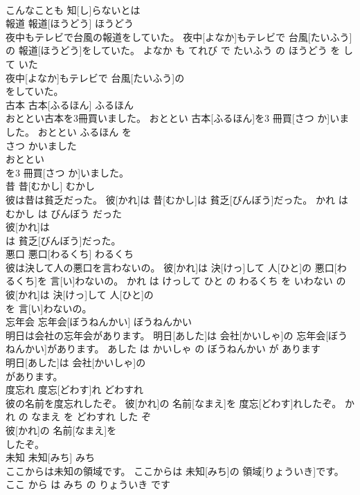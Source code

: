 \documentclass[8pt]{extreport}
\begin{document}
\begin{CJK}{UTF8}{min}
\\	こんなことも 知[し]らないとは
\\	報道	報道[ほうどう]	ほうどう	
\\	夜中もテレビで台風の報道をしていた。	夜中[よなか]もテレビで 台風[たいふう]の 報道[ほうどう]をしていた。	よなか も てれび で たいふう の ほうどう を して いた	
\\	夜中[よなか]もテレビで 台風[たいふう]の
\\	をしていた。			
\\	古本	古本[ふるほん]	ふるほん	
\\	おととい古本を3冊買いました。	おととい 古本[ふるほん]を3 冊買[さつ か]いました。	おととい ふるほん を 
\\	さつ かいました	
\\	おととい
\\	を3 冊買[さつ か]いました。			
\\	昔	昔[むかし]	むかし	
\\	彼は昔は貧乏だった。	彼[かれ]は 昔[むかし]は 貧乏[びんぼう]だった。	かれ は むかし は びんぼう だった	
\\	彼[かれ]は
\\	は 貧乏[びんぼう]だった。			
\\	悪口	悪口[わるくち]	わるくち	
\\	彼は決して人の悪口を言わないの。	彼[かれ]は 決[けっ]して 人[ひと]の 悪口[わるくち]を 言[い]わないの。	かれ は けっして ひと の わるくち を いわない の	
\\	彼[かれ]は 決[けっ]して 人[ひと]の
\\	を 言[い]わないの。			
\\	忘年会	忘年会[ぼうねんかい]	ぼうねんかい	
\\	明日は会社の忘年会があります。	明日[あした]は 会社[かいしゃ]の 忘年会[ぼうねんかい]があります。	あした は かいしゃ の ぼうねんかい が あります	
\\	明日[あした]は 会社[かいしゃ]の
\\	があります。			
\\	度忘れ	度忘[どわす]れ	どわすれ	
\\	彼の名前を度忘れしたぞ。	彼[かれ]の 名前[なまえ]を 度忘[どわす]れしたぞ。	かれ の なまえ を どわすれ した ぞ	
\\	彼[かれ]の 名前[なまえ]を
\\	したぞ。			
\\	未知	未知[みち]	みち	
\\	ここからは未知の領域です。	ここからは 未知[みち]の 領域[りょういき]です。	ここ から は みち の りょういき です	

\end{CJK}
\end{document}
